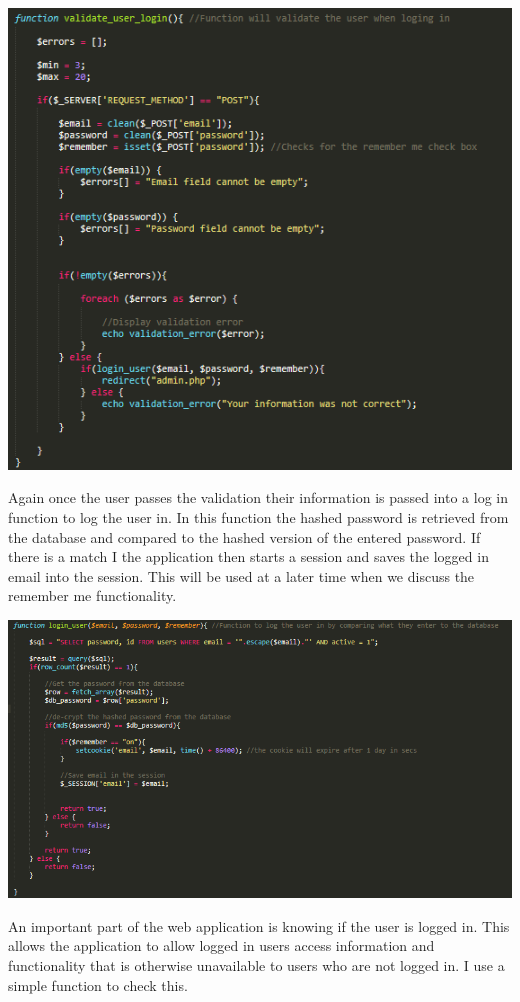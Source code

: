 \includegraphics[width=\textwidth,height=\textheight,keepaspectratio]{img/validateLogin.png}

Again once the user passes the validation their information is passed into a log in function to log the user in. In this function the hashed password is retrieved from the database and compared to the hashed version of the entered password. If there is a match I the application then starts a session and saves the logged in email into the session. This will be used at a later time when we discuss the remember me functionality.

\includegraphics[width=\textwidth,height=\textheight,keepaspectratio]{img/loginUser.png}

An important part of the web application is knowing if the user is logged in. This allows the application to allow logged in users access information and functionality that is otherwise unavailable to users who are not logged in. I use a simple function to check this.

